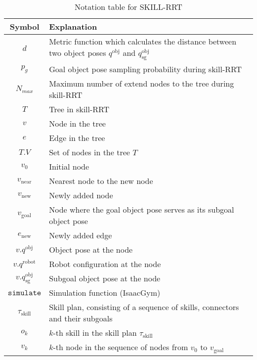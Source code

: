 \begin{table}[h!]
\large
\centering
\begin{adjustbox}{width=\columnwidth} %
\begin{tabular}{|c|p{}|} %
\hline
\textbf{Symbol} & \textbf{Explanation} \\ \hline

$d$ & Metric function which calculates the distance between two object poses $q^{\text{obj}}$ and $q^{\text{obj}}_{\text{sg}}$ \\ \hline
$p_g$ & Goal object pose sampling probability during skill-RRT \\ \hline
$N_{max}$ & Maximum number of extend nodes to the tree during skill-RRT \\ \hline
$T$ & Tree in skill-RRT \\ \hline
$v$ & Node in the tree \\ \hline
$e$ & Edge in the tree \\ \hline
$T.V$ & Set of nodes in the tree $T$ \\ \hline
$v_0$ & Initial node \\ \hline
$v_{\text{near}}$ & Nearest node to the new node \\ \hline
$v_{\text{new}}$ & Newly added node \\ \hline
$v_{\text{goal}}$ & Node where the goal object pose serves as its subgoal object pose \\ \hline
$e_{\text{new}}$ & Newly added edge \\ \hline
$v.q^{\text{obj}}$ & Object pose at the node \\ \hline
$v.q^{\text{robot}}$ & Robot configuration at the node \\ \hline
$v.q^{\text{obj}}_{\text{sg}}$ & Subgoal object pose at the node \\ \hline
$\texttt{simulate}$ & Simulation function (IsaacGym) \\ \hline
$\tau_{\text{skill}}$ & Skill plan, consisting of a sequence of skills, connectors and their subgoals \\ \hline
$o_k$ & $k$-th skill in the skill plan $\tau_{\text{skill}}$ \\ \hline
$v_k$ & $k$-th node in the sequence of nodes from $v_0$ to $v_\text{goal}$ \\ \hline

\end{tabular}
\end{adjustbox}
\caption{Notation table for SKILL-RRT}
\label{tab:skillrrt_notation}
\end{table}